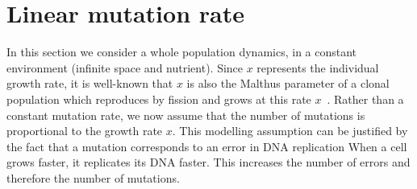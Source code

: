 





\section{Linear mutation rate}

In this section we {\MD consider a whole population dynamics, in a constant environment (infinite space and nutrient). Since $x$ represents the individual growth rate, it is well-known that $x$ is also the Malthus parameter of a clonal population which reproduces by fission and grows at this rate $x$~\cite{robert:hal-00981312}. Rather than a constant mutation rate, we now} assume that the number of mutations is proportional to the growth rate $x$. This modelling assumption can be justified by the fact that a mutation corresponds to an error in DNA replication %
When a cell grows faster, it replicates its DNA faster. This increases the number of errors and therefore the number of mutations.\\

